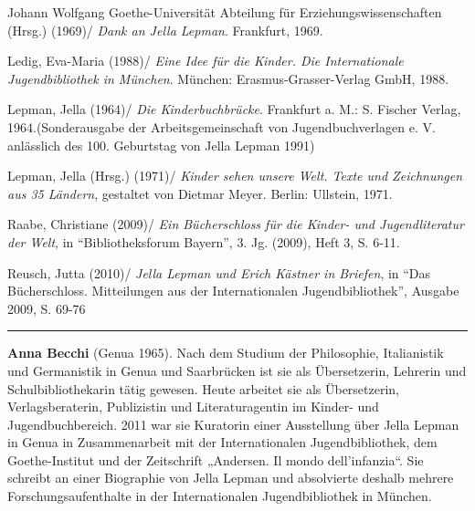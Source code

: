 \documentclass[a4paper,
fontsize=11pt,
oneside,
numbers=noperiodatend,
parskip=half-,
bibliography=totoc,
final
]{scrartcl}
\begin{document}
Johann Wolfgang Goethe-Universität Abteilung für
Erziehungswissenschaften (Hrsg.) (1969)/ \emph{Dank an Jella Lepman}.
Frankfurt, 1969.

Ledig, Eva-Maria (1988)/ \emph{Eine Idee für die Kinder. Die
Internationale Jugendbibliothek in München}. München:
Erasmus-Grasser-Verlag GmbH, 1988.

Lepman, Jella (1964)/ \emph{Die Kinderbuchbrücke}. Frankfurt a. M.: S.
Fischer Verlag, 1964.(Sonderausgabe der Arbeitsgemeinschaft von
Jugendbuchverlagen e. V. anlässlich des 100. Geburtstag von Jella Lepman
1991)

Lepman, Jella (Hrsg.) (1971)/ \emph{Kinder sehen unsere Welt. Texte und
Zeichnungen aus 35 Ländern}, gestaltet von Dietmar Meyer. Berlin:
Ullstein, 1971.

Raabe, Christiane (2009)/ \emph{Ein Bücherschloss für die Kinder- und
Jugendliteratur der Welt}, in \enquote{Bibliotheksforum Bayern}, 3. Jg.
(2009), Heft 3, S. 6-11.

Reusch, Jutta (2010)/ \emph{Jella Lepman und Erich Kästner in Briefen},
in \enquote{Das Bücherschloss. Mitteilungen aus der Internationalen
Jugendbibliothek}, Ausgabe 2009, S. 69-76

\begin{center}\rule{3in}{0.4pt}\end{center}

\textbf{Anna Becchi} (Genua 1965). Nach dem Studium der Philosophie,
Italianistik und Germanistik in Genua und Saarbrücken ist sie als
Übersetzerin, Lehrerin und Schulbibliothekarin tätig gewesen. Heute
arbeitet sie als Übersetzerin, Verlagsberaterin, Publizistin und
Literaturagentin im Kinder- und Jugendbuchbereich. 2011 war sie
Kuratorin einer Ausstellung über Jella Lepman in Genua in Zusammenarbeit
mit der Internationalen Jugendbibliothek, dem Goethe-Institut und der
Zeitschrift „Andersen. Il mondo dell'infanzia``. Sie schreibt an einer
Biographie von Jella Lepman und absolvierte deshalb mehrere
Forschungsaufenthalte in der Internationalen Jugendbibliothek in
München.
\end{document}
